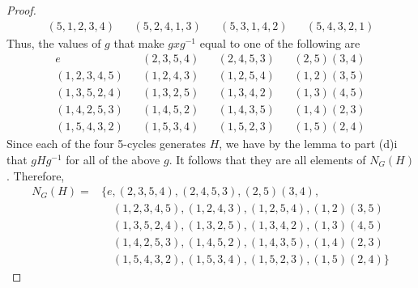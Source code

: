 \documentclass[../psets.tex]{subfiles}
\begin{document}
\begin{enumerate}
\begin{enumerate}
\begin{enumerate}
\begin{proof}
\begin{align*}
                    (5,1,2,3,4)&&
                        (5,2,4,1,3)&&
                            (5,3,1,4,2)&&
                                (5,4,3,2,1)
                \end{align*}
                Thus, the values of $g$ that make $gxg^{-1}$ equal to one of the following are
                \begin{align*}
                    e&&
                        (2,3,5,4)&&
                            (2,4,5,3)&&
                                (2,5)(3,4)\\
                    (1,2,3,4,5)&&
                        (1,2,4,3)&&
                            (1,2,5,4)&&
                                (1,2)(3,5)\\
                    (1,3,5,2,4)&&
                        (1,3,2,5)&&
                            (1,3,4,2)&&
                                (1,3)(4,5)\\
                    (1,4,2,5,3)&&
                        (1,4,5,2)&&
                            (1,4,3,5)&&
                                (1,4)(2,3)\\
                    (1,5,4,3,2)&&
                        (1,5,3,4)&&
                            (1,5,2,3)&&
                                (1,5)(2,4)
                \end{align*}
                Since each of the four 5-cycles generates $H$, we have by the lemma to part (d)i that $gHg^{-1}$ for all of the above $g$. It follows that they are all elements of $N_G(H)$. Therefore,
                \begin{equation*}
                    \boxed{
                        \begin{aligned}
                            N_G(H) ={}& \{e,(2,3,5,4),(2,4,5,3),(2,5)(3,4),\\
                            &\quad(1,2,3,4,5),(1,2,4,3),(1,2,5,4),(1,2)(3,5)\\
                            &\quad(1,3,5,2,4),(1,3,2,5),(1,3,4,2),(1,3)(4,5)\\
                            &\quad(1,4,2,5,3),(1,4,5,2),(1,4,3,5),(1,4)(2,3)\\
                            &\quad(1,5,4,3,2),(1,5,3,4),(1,5,2,3),(1,5)(2,4)\}
                        \end{aligned}
                    }
                \end{equation*}
            \end{proof}
        \end{enumerate}

\end{enumerate}
\end{enumerate}
\end{document}
